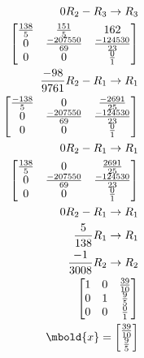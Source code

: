 \documentclass[12pt letter]{report}
\begin{document}
{\begin{enumerate}
\begin{align*}
            \\
            0R_2 - R_3  \rightarrow R_3                \\
            \begin{bmatrix}
              \frac{138}{5} & \frac{151}{5}      & 162                \\
              0             & \frac{-207550}{69} & \frac{-124530}{23} \\
              0             & 0                  & \frac{0}{1}        \\
            \end{bmatrix}
            \\
            \frac{-98}{9761}R_2 - R_1  \rightarrow R_1 \\
            \begin{bmatrix}
              \frac{-138}{5} & 0                  & \frac{-2691}{25}   \\
              0              & \frac{-207550}{69} & \frac{-124530}{23} \\
              0              & 0                  & \frac{0}{1}        \\
            \end{bmatrix}
            \\
            0R_2 - R_1  \rightarrow R_1                \\
            \begin{bmatrix}
              \frac{138}{5} & 0                  & \frac{2691}{25}    \\
              0             & \frac{-207550}{69} & \frac{-124530}{23} \\
              0             & 0                  & \frac{0}{1}        \\
            \end{bmatrix}
            \\
            0R_2 - R_1  \rightarrow R_1                \\
            \frac{5}{138}R_1 \to R_1                   \\
            \frac{-1}{3008}R_2 \to R_2                 \\
            \begin{bmatrix}
              1 & 0 & \frac{39}{10} \\
              0 & 1 & \frac{9}{5}   \\
              0 & 0 & \frac{0}{1}   \\
            \end{bmatrix}
            \\
            \mbold{x} = \begin{bmatrix} \frac{39}{10} \\ \frac{9}{5} \end{bmatrix}
          \end{align*}

  \end{enumerate}
}
\end{document}
